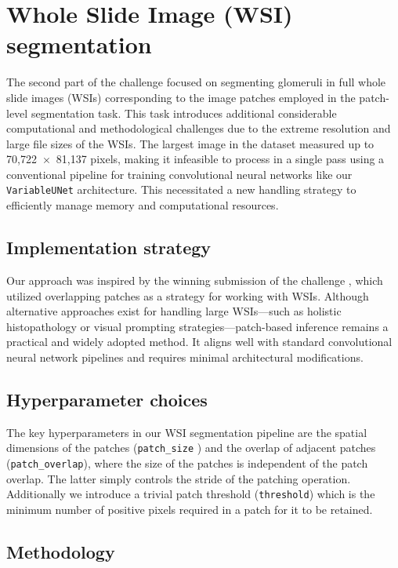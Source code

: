 \documentclass[12pt]{article}
\begin{document}
\section{Whole Slide Image (WSI) segmentation}

The second part of the challenge focused on segmenting glomeruli in full whole slide images (WSIs) corresponding to the image patches employed in the patch-level segmentation task. This task introduces additional considerable computational and methodological challenges due to the extreme resolution and large file sizes of the WSIs. The largest image in the dataset measured up to 70,722~$\times$~81,137 pixels, making it infeasible to process in a single pass using a conventional pipeline for training convolutional neural networks like our \texttt{VariableUNet} architecture. This necessitated a new handling strategy to efficiently manage memory and computational resources.

\subsection{Implementation strategy}

Our approach was inspired by the winning submission of the challenge \cite{Cap.07.11.2024}, which utilized overlapping patches as a strategy for working with WSIs. Although alternative approaches exist for handling large WSIs—such as holistic histopathology \cite{Tang.03.07.2024} or visual prompting \cite{Wu.21.02.2024} strategies—patch-based inference remains a practical and widely adopted method. It aligns well with standard convolutional neural network pipelines and requires minimal architectural modifications.

\subsection{Hyperparameter choices}

The key hyperparameters in our WSI segmentation pipeline are the spatial dimensions of the patches (\texttt{patch\_size}    ) and the overlap of adjacent patches (\texttt{patch\_overlap}), where the size of the patches is independent of the patch overlap. The latter simply controls the stride of the patching operation. Additionally we introduce a trivial patch threshold (\texttt{threshold}) which is the minimum number of positive pixels required in a patch for it to be retained.

\subsection{Methodology}
\end{document}
